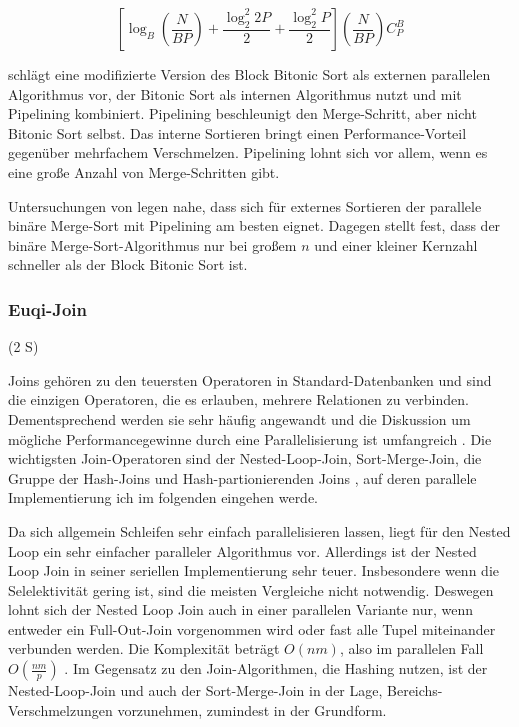\documentclass[a4paper,12pt,twoside]{article}
\begin{document}
\[ \left[ \log _B (\frac {N} {B P}) + \frac {\log _2 ^2 2 P} {2} + \frac {\log _2 ^2 P} {2} \right] ( \frac {N}{B P}) C _{P} ^{B} \]

{\textcite{Menon1986}} schlägt eine modifizierte Version des Block Bitonic Sort als externen parallelen Algorithmus vor, der Bitonic Sort als internen Algorithmus nutzt und mit Pipelining kombiniert. Pipelining beschleunigt den Merge-Schritt, aber nicht Bitonic Sort selbst. Das interne Sortieren bringt einen Performance-Vorteil gegenüber mehrfachem Verschmelzen. Pipelining lohnt sich vor allem, wenn es eine große Anzahl von Merge-Schritten gibt.

Untersuchungen von {\textcite{Bitton1984}} legen nahe, dass sich für externes Sortieren der parallele binäre Merge-Sort mit Pipelining am besten eignet. Dagegen stellt {\textcite{Menon1986}} fest, dass der binäre Merge-Sort-Algorithmus nur bei großem $n$ und einer kleiner Kernzahl schneller als der Block Bitonic Sort ist.

\subsubsection{Euqi-Join} (2 S)
\label{Equi Join} 

Joins gehören zu den teuersten Operatoren in Standard-Datenbanken und sind die einzigen Operatoren, die es erlauben, mehrere Relationen zu verbinden. Dementsprechend werden sie sehr häufig angewandt und die Diskussion um mögliche Performancegewinne durch eine Parallelisierung ist umfangreich {\autocite{Richardson1987, Valduriez1984, Schneider1989, DeWitt1985, Lu1994}}. Die wichtigsten Join-Operatoren sind der Nested-Loop-Join, Sort-Merge-Join, die Gruppe der Hash-Joins und Hash-partionierenden Joins {\autocite{Mishra1992, Lu1994}}, auf deren parallele Implementierung ich im folgenden eingehen werde.

Da sich allgemein Schleifen sehr einfach parallelisieren lassen, liegt für den Nested Loop ein sehr einfacher paralleler Algorithmus vor. Allerdings ist der Nested Loop Join in seiner seriellen Implementierung sehr teuer. Insbesondere wenn die Selelektivität gering ist, sind die meisten Vergleiche nicht notwendig. Deswegen lohnt sich der Nested Loop Join auch in einer parallelen Variante nur, wenn entweder ein Full-Out-Join vorgenommen wird oder fast alle Tupel miteinander verbunden werden. Die Komplexität beträgt $ O(n m) $, also im parallelen Fall $ O( \frac {n m} {p} )$ {\autocite[S. 72]{Mishra1992}}. Im Gegensatz zu den Join-Algorithmen, die Hashing nutzen, ist der Nested-Loop-Join und auch der Sort-Merge-Join in der Lage, Bereichs-Verschmelzungen vorzunehmen, zumindest in der Grundform. 
\end{document}
